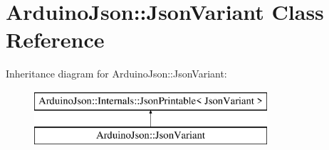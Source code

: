 \hypertarget{class_arduino_json_1_1_json_variant}{}\section{Arduino\+Json\+:\+:Json\+Variant Class Reference}
\label{class_arduino_json_1_1_json_variant}
Inheritance diagram for Arduino\+Json\+:\+:Json\+Variant\+:\begin{figure}[H]
\begin{center}
\leavevmode
\includegraphics[height=2.000000cm]{class_arduino_json_1_1_json_variant}
\end{center}
\end{figure}
